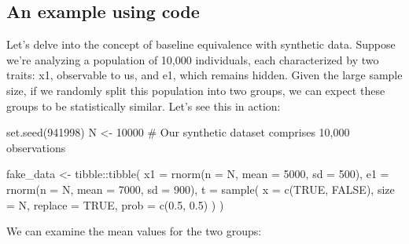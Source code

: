 \documentclass[
  letterpaper,
  DIV=11,
  numbers=noendperiod]{scrreprt}
\newenvironment{Shaded}{\begin{snugshade}}{\end{snugshade}}
\newcommand{\AttributeTok}[1]{\textcolor[rgb]{0.40,0.45,0.13}{#1}}
\newcommand{\CommentTok}[1]{\textcolor[rgb]{0.37,0.37,0.37}{#1}}
\newcommand{\ConstantTok}[1]{\textcolor[rgb]{0.56,0.35,0.01}{#1}}
\newcommand{\DecValTok}[1]{\textcolor[rgb]{0.68,0.00,0.00}{#1}}
\newcommand{\FloatTok}[1]{\textcolor[rgb]{0.68,0.00,0.00}{#1}}
\newcommand{\FunctionTok}[1]{\textcolor[rgb]{0.28,0.35,0.67}{#1}}
\newcommand{\NormalTok}[1]{\textcolor[rgb]{0.00,0.23,0.31}{#1}}
\newcommand{\OtherTok}[1]{\textcolor[rgb]{0.00,0.23,0.31}{#1}}
\newcommand{\SpecialCharTok}[1]{\textcolor[rgb]{0.37,0.37,0.37}{#1}}
\begin{document}
\subsection{An example using code}\label{an-example-using-code}

Let's delve into the concept of baseline equivalence with synthetic
data. Suppose we're analyzing a population of 10,000 individuals, each
characterized by two traits: x1, observable to us, and e1, which remains
hidden. Given the large sample size, if we randomly split this
population into two groups, we can expect these groups to be
statistically similar. Let's see this in action:

\begin{Shaded}
\begin{Highlighting}[]
\FunctionTok{set.seed}\NormalTok{(}\DecValTok{941998}\NormalTok{)}
\NormalTok{N }\OtherTok{\textless{}{-}} \DecValTok{10000}  \CommentTok{\# Our synthetic dataset comprises 10,000 observations}

\NormalTok{fake\_data }\OtherTok{\textless{}{-}}\NormalTok{ tibble}\SpecialCharTok{::}\FunctionTok{tibble}\NormalTok{(}
  \AttributeTok{x1 =} \FunctionTok{rnorm}\NormalTok{(}\AttributeTok{n =}\NormalTok{ N, }\AttributeTok{mean =} \DecValTok{5000}\NormalTok{, }\AttributeTok{sd =} \DecValTok{500}\NormalTok{),}
  \AttributeTok{e1  =} \FunctionTok{rnorm}\NormalTok{(}\AttributeTok{n =}\NormalTok{ N, }\AttributeTok{mean =} \DecValTok{7000}\NormalTok{, }\AttributeTok{sd =} \DecValTok{900}\NormalTok{),}
  \AttributeTok{t =} \FunctionTok{sample}\NormalTok{(}
    \AttributeTok{x =} \FunctionTok{c}\NormalTok{(}\ConstantTok{TRUE}\NormalTok{, }\ConstantTok{FALSE}\NormalTok{),}
    \AttributeTok{size =}\NormalTok{ N,}
    \AttributeTok{replace =} \ConstantTok{TRUE}\NormalTok{,}
    \AttributeTok{prob =} \FunctionTok{c}\NormalTok{(}\FloatTok{0.5}\NormalTok{, }\FloatTok{0.5}\NormalTok{)}
\NormalTok{  )}
\NormalTok{)}
\end{Highlighting}
\end{Shaded}

We can examine the mean values for the two groups:
\end{document}
